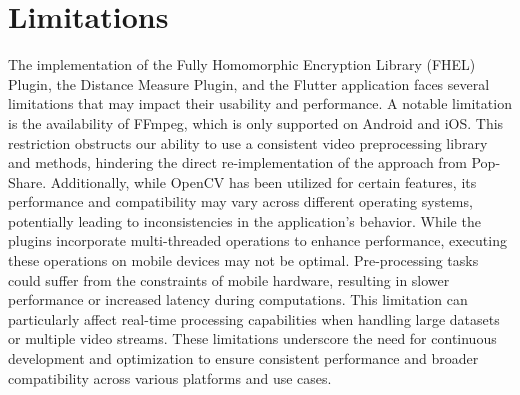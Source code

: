 \section{Limitations}
The implementation of the Fully Homomorphic Encryption Library (FHEL) Plugin, the Distance Measure Plugin, and the Flutter application faces several limitations that may impact their usability and performance.
A notable limitation is the availability of FFmpeg, which is only supported on Android and iOS. This restriction obstructs our ability to use a consistent video preprocessing library and methods, hindering the direct re-implementation of the approach from Pop-Share. Additionally, while OpenCV has been utilized for certain features, its performance and compatibility may vary across different operating systems, potentially leading to inconsistencies in the application's behavior.
While the plugins incorporate multi-threaded operations to enhance performance, executing these operations on mobile devices may not be optimal. Pre-processing tasks could suffer from the constraints of mobile hardware, resulting in slower performance or increased latency during computations. This limitation can particularly affect real-time processing capabilities when handling large datasets or multiple video streams.
These limitations underscore the need for continuous development and optimization to ensure consistent performance and broader compatibility across various platforms and use cases.
